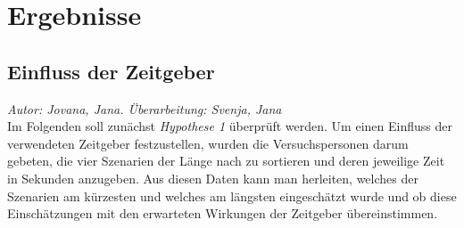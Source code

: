\documentclass{Paper}
\begin{document}
\section{Ergebnisse}
\subsection{Einfluss der Zeitgeber}
        \textit{Autor: Jovana, Jana. Überarbeitung: Svenja, Jana}\\
Im Folgenden soll zunächst \textit{Hypothese 1} überprüft werden. Um einen Einfluss der verwendeten Zeitgeber festzustellen, wurden die Versuchspersonen darum gebeten, die vier Szenarien der Länge nach zu sortieren und deren jeweilige Zeit in Sekunden anzugeben. Aus diesen Daten kann man herleiten, welches der Szenarien am kürzesten und welches am längsten eingeschätzt wurde und ob diese Einschätzungen mit den erwarteten Wirkungen der Zeitgeber übereinstimmen.
\end{document}
